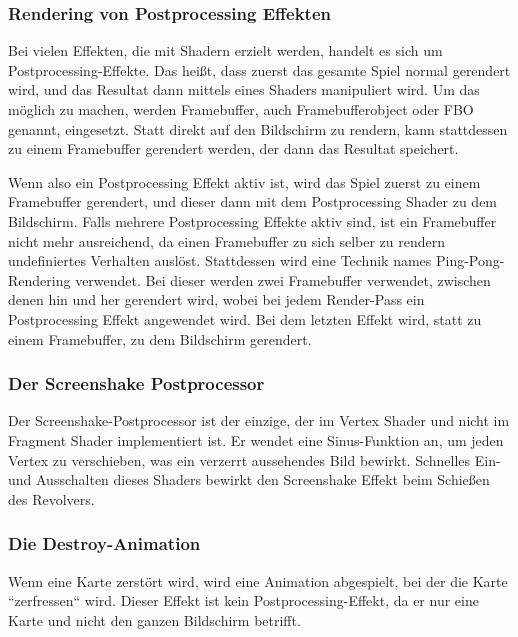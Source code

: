 \subsubsection{Rendering von Postprocessing Effekten}\label{subsubsec:postprocessing-effects}

Bei vielen Effekten, die mit Shadern erzielt werden, handelt es sich um Postprocessing-Effekte.
Das heißt, dass zuerst das gesamte Spiel normal gerendert wird, und das Resultat dann mittels eines Shaders
manipuliert wird.
Um das möglich zu machen, werden Framebuffer, auch Framebufferobject oder FBO genannt, eingesetzt.
Statt direkt auf den Bildschirm zu rendern, kann stattdessen zu einem Framebuffer gerendert werden, der dann das
Resultat speichert.\cite{openGlFbo}

Wenn also ein Postprocessing Effekt aktiv ist, wird das Spiel zuerst zu einem Framebuffer gerendert, und dieser dann
mit dem Postprocessing Shader zu dem Bildschirm.
Falls mehrere Postprocessing Effekte aktiv sind, ist ein Framebuffer nicht mehr ausreichend, da einen Framebuffer
zu sich selber zu rendern undefiniertes Verhalten auslöst.\cite{openGlFbo}
Stattdessen wird eine Technik names Ping-Pong-Rendering verwendet.\cite{pingPongRendering}
Bei dieser werden zwei Framebuffer verwendet, zwischen denen hin und her gerendert wird, wobei bei jedem Render-Pass ein
Postprocessing Effekt angewendet wird.
Bei dem letzten Effekt wird, statt zu einem Framebuffer, zu dem Bildschirm gerendert.

\subsubsection{Der Screenshake Postprocessor}

Der Screenshake-Postprocessor ist der einzige, der im Vertex Shader und nicht im Fragment Shader implementiert ist.
Er wendet eine Sinus-Funktion an, um jeden Vertex zu verschieben, was ein verzerrt aussehendes Bild bewirkt.
Schnelles Ein- und Ausschalten dieses Shaders bewirkt den Screenshake Effekt beim Schießen des Revolvers.

\subsubsection{Die Destroy-Animation}

Wenn eine Karte zerstört wird, wird eine Animation abgespielt, bei der die Karte ``zerfressen`` wird.
Dieser Effekt ist kein Postprocessing-Effekt, da er nur eine Karte und nicht den ganzen Bildschirm betrifft.

